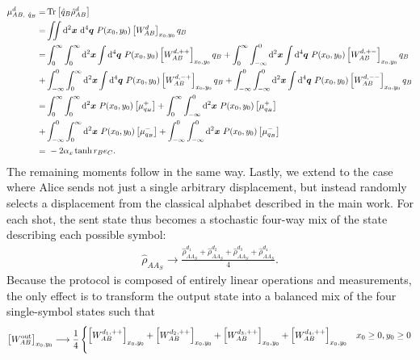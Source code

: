 \documentclass[%
 reprint,
 superscriptaddress,
 amsmath,
 amssymb,
 aps,
 pra,
]{revtex4-2}
\begin{document}
\begin{widetext}
\begin{align}
    \mu_{AB, \ \hat q_B}^d = &\Tr \left[ \hat q_B \hat \rho_{AB}^d \right] \\
    = &\iint \dd^2\bm{x} \ \dd^4 \bm{q} \ P(x_0,y_0) \left[ W_{AB}^d \right]_{x_0,y_0} q_B \\
    = &\int_0^\infty \int_0^\infty \dd^2\bm{x} \int \dd^4 \bm{q} \ P(x_0,y_0) \left[ W_{AB}^{d,++} \right]_{x_0,y_0} q_B +\int_0^\infty \int_{-\infty}^0 \dd^2\bm{x} \int \dd^4 \bm{q} \ P(x_0,y_0) \left[ W_{AB}^{d,+-} \right]_{x_0,y_0} q_B \notag \\
    + &\int_{-\infty}^0 \int_0^\infty \dd^2\bm{x} \int \dd^4 \bm{q} \ P(x_0,y_0) \left[ W_{AB}^{d,-+} \right]_{x_0,y_0} q_B + \int_{-\infty}^0 \int_{-\infty}^0 \dd^2\bm{x} \int \dd^4 \bm{q} \ P(x_0,y_0) \left[ W_{AB}^{d,--} \right]_{x_0,y_0} q_B \\
    = &\int_0^\infty \int_0^\infty \dd^2\bm{x} \ P(x_0,y_0) \left[ \mu_{q_B}^+ \right] +\int_0^\infty \int_{-\infty}^0 \dd^2\bm{x} \ P(x_0,y_0) \left[ \mu_{q_B}^+ \right] \notag\\
    + &\int_{-\infty}^0 \int_0^\infty \dd^2\bm{x} \ P(x_0,y_0) \left[ \mu_{q_B}^- \right] + \int_{-\infty}^0 \int_{-\infty}^0 \dd^2\bm{x} \ P(x_0,y_0) \left[ \mu_{q_B}^- \right] \\
    = &\ -2 \alpha_x \tanh r_B e_C.
\end{align}
The remaining moments follow in the same way. Lastly, we extend to the case where Alice sends not just a single arbitrary displacement, but instead randomly selects a displacement from the classical alphabet described in the main work. For each shot, the sent state thus becomes a stochastic four-way mix of the state describing each possible symbol:
\begin{align}
    \hat \rho_{AA_S} \longrightarrow \frac{\hat \rho_{AA_S}^{d_1} + \hat \rho_{AA_S}^{d_2} + \hat \rho_{AA_S}^{d_3} + \hat \rho_{AA_S}^{d_4}}{4}.
\end{align}
Because the protocol is composed of entirely linear operations and measurements, the only effect is to transform the output state into a balanced mix of the four single-symbol states such that
\begin{align}
    \left[ W_{AB}^\mathrm{out} \right]_{x_0,y_0} \longrightarrow \frac{1}{4}\begin{cases}
        \left[ W_{AB}^{d_1,++} \right]_{x_0,y_0} + \left[ W_{AB}^{d_2,++} \right]_{x_0,y_0} + \left[ W_{AB}^{d_3,++} \right]_{x_0,y_0} + \left[ W_{AB}^{d_4,++} \right]_{x_0,y_0} & x_0 \geq 0, y_0 \geq 0 \vspace{0.25cm} \\

\end{cases}
\end{align}
\end{widetext}
\end{document}
